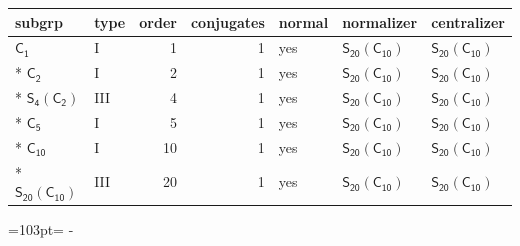 \documentclass[10pt,a4paper]{article}
\newcommand{\needspace}[1]{\par\penalty-100\begingroup\dimen0=#1\relax\dimen2=\pagegoal
  \advance\dimen2-\pagetotal\ifdim\dimen0>\dimen2\relax\ifdim\dimen2>0pt\vfil\break\fi\fi
  \endgroup}
\numberwithin{equation}{section}
\newcommand{\grp}[1]{\mathsf{#1}}
\begin{document}
{\small\begin{longtable}{@{}llrrlll@{}}\toprule
subgrp & type & order & conjugates & normal & normalizer & centralizer\\\midrule\endhead
\bottomrule\endfoot\endlastfoot
\href{../../../rotation/data/pdf/C1.pdf}{$\grp{C_{1}}$} & I & 1 & 1 & yes & \href{S20-C10.pdf}{$\grp{S_{20}}(\grp{C_{10}})$} & \href{S20-C10.pdf}{$\grp{S_{20}}(\grp{C_{10}})$}\\*
\href{../../../rotation/data/pdf/C2.pdf}{$\grp{C_{2}}$} & I & 2 & 1 & yes & \href{S20-C10.pdf}{$\grp{S_{20}}(\grp{C_{10}})$} & \href{S20-C10.pdf}{$\grp{S_{20}}(\grp{C_{10}})$}\\*
\href{S4-C2.pdf}{$\grp{S_{4}}(\grp{C_{2}})$} & III & 4 & 1 & yes & \href{S20-C10.pdf}{$\grp{S_{20}}(\grp{C_{10}})$} & \href{S20-C10.pdf}{$\grp{S_{20}}(\grp{C_{10}})$}\\*
\href{../../../rotation/data/pdf/C5.pdf}{$\grp{C_{5}}$} & I & 5 & 1 & yes & \href{S20-C10.pdf}{$\grp{S_{20}}(\grp{C_{10}})$} & \href{S20-C10.pdf}{$\grp{S_{20}}(\grp{C_{10}})$}\\*
\href{../../../rotation/data/pdf/C10.pdf}{$\grp{C_{10}}$} & I & 10 & 1 & yes & \href{S20-C10.pdf}{$\grp{S_{20}}(\grp{C_{10}})$} & \href{S20-C10.pdf}{$\grp{S_{20}}(\grp{C_{10}})$}\\*
\href{S20-C10.pdf}{$\grp{S_{20}}(\grp{C_{10}})$} & III & 20 & 1 & yes & \href{S20-C10.pdf}{$\grp{S_{20}}(\grp{C_{10}})$} & \href{S20-C10.pdf}{$\grp{S_{20}}(\grp{C_{10}})$}\\
\bottomrule\end{longtable}}
\needspace{103pt}
\end{document}
